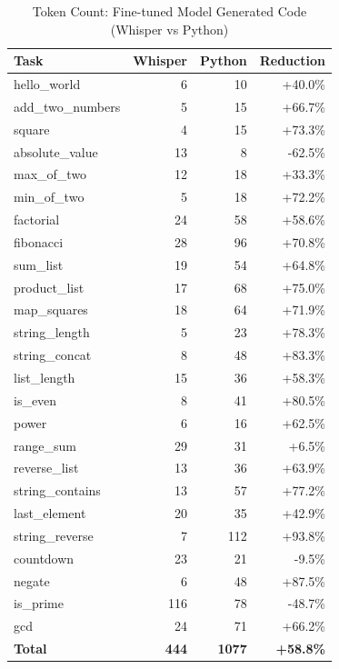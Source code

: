 \begin{table}[h]
\centering
\caption{Token Count: Fine-tuned Model Generated Code (Whisper vs Python)}
\label{tab:token-comparison}
\begin{tabular}{lrrr}
\hline
Task & Whisper & Python & Reduction \\
\hline
hello_world & 6 & 10 & +40.0\% \\
add_two_numbers & 5 & 15 & +66.7\% \\
square & 4 & 15 & +73.3\% \\
absolute_value & 13 & 8 & -62.5\% \\
max_of_two & 12 & 18 & +33.3\% \\
min_of_two & 5 & 18 & +72.2\% \\
factorial & 24 & 58 & +58.6\% \\
fibonacci & 28 & 96 & +70.8\% \\
sum_list & 19 & 54 & +64.8\% \\
product_list & 17 & 68 & +75.0\% \\
map_squares & 18 & 64 & +71.9\% \\
string_length & 5 & 23 & +78.3\% \\
string_concat & 8 & 48 & +83.3\% \\
list_length & 15 & 36 & +58.3\% \\
is_even & 8 & 41 & +80.5\% \\
power & 6 & 16 & +62.5\% \\
range_sum & 29 & 31 & +6.5\% \\
reverse_list & 13 & 36 & +63.9\% \\
string_contains & 13 & 57 & +77.2\% \\
last_element & 20 & 35 & +42.9\% \\
string_reverse & 7 & 112 & +93.8\% \\
countdown & 23 & 21 & -9.5\% \\
negate & 6 & 48 & +87.5\% \\
is_prime & 116 & 78 & -48.7\% \\
gcd & 24 & 71 & +66.2\% \\
\hline
\textbf{Total} & \textbf{444} & \textbf{1077} & \textbf{+58.8\%} \\
\hline
\end{tabular}
\end{table}
